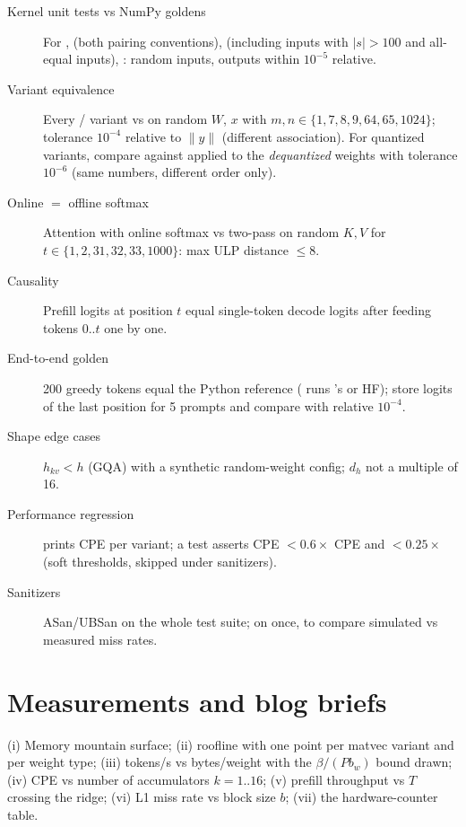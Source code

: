 \begin{description}
  \item[Kernel unit tests vs NumPy goldens] For ,  (both pairing conventions),  (including inputs with $|s|>100$ and all-equal inputs), : random inputs, outputs within $10^{-5}$ relative.
  \item[Variant equivalence] Every / variant vs  on random $W$, $x$ with $m,n \in\{1,7,8,9,64,65,1024\}$; tolerance $10^{-4}$ relative to $\|y\|$ (different association). For quantized variants, compare against  applied to the \emph{dequantized} weights with tolerance $10^{-6}$ (same numbers, different order only).
  \item[Online $=$ offline softmax] Attention with online softmax vs two-pass on random $K,V$ for $t \in \{1, 2, 31, 32, 33, 1000\}$: max ULP distance $\le 8$.
  \item[Causality] Prefill logits at position $t$ equal single-token decode logits after feeding tokens $0..t$ one by one.
  \item[End-to-end golden] 200 greedy tokens equal the Python reference ( runs 's  or HF); store logits of the last position for 5 prompts and compare with relative $10^{-4}$.
  \item[Shape edge cases] $h_{kv} < h$ (GQA) with a synthetic random-weight config; $d_h$ not a multiple of 16.
  \item[Performance regression]  prints CPE per variant; a test asserts  CPE $< 0.6\times$  CPE and  $< 0.25\times$ (soft thresholds, skipped under sanitizers).
  \item[Sanitizers] ASan/UBSan on the whole test suite;  on  once, to compare simulated vs measured miss rates.
\end{description}

\section{Measurements and blog briefs}

(i) Memory mountain surface; (ii) roofline with one point per matvec variant and per weight type; (iii) tokens/s vs bytes/weight with the $\beta/(Pb_w)$ bound drawn; (iv) CPE vs number of accumulators $k=1..16$; (v) prefill throughput vs $T$ crossing the ridge; (vi) L1 miss rate vs block size $b$; (vii) the hardware-counter table.

